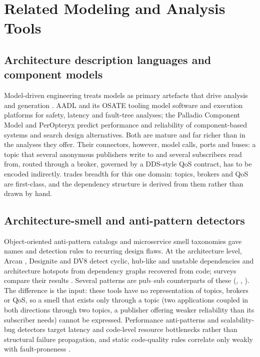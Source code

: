 \section{Related Modeling and Analysis Tools}
\label{sec:related_work}

\subsection{Architecture description languages and component models}
\label{sec:related:mde}

Model-driven engineering treats models as primary artefacts that drive analysis and generation \citep{schmidt2006mde, combemale2016global}. AADL and its OSATE tooling \citep{feiler2006aadl} model software and execution platforms for safety, latency and fault-tree analyses; the Palladio Component Model \citep{becker2009palladio} and PerOpteryx \citep{koziolek2011peropteryx} predict performance and reliability of component-based systems and search design alternatives. Both are mature and far richer than \sag{} in the analyses they offer. Their connectors, however, model calls, ports and buses: a topic that several anonymous publishers write to and several subscribers read from, routed through a broker, governed by a DDS-style QoS contract, has to be encoded indirectly. \sag{} trades breadth for this one domain: topics, brokers and QoS are first-class, and the dependency structure is derived from them rather than drawn by hand.

\subsection{Architecture-smell and anti-pattern detectors}
\label{sec:related:smells}

Object-oriented anti-pattern catalogs \citep{brown1998antipatterns, fowler1999refactoring, suryanarayana2014refactoring} and microservice smell taxonomies \citep{taibi2020microservices} gave names and detection rules to recurring design flaws. At the architecture level, Arcan \citep{arcan2017}, Designite \citep{sharma2016designite} and DV8 \citep{cai2019dv8} detect cyclic, hub-like and unstable dependencies and architecture hotspots \citep{mo2015hotspot} from dependency graphs recovered from code; surveys compare their results \citep{azadi2019architectural, mumtaz2021systematic}. Several \sag{} patterns are pub--sub counterparts of these (, , ). The difference is the input: these tools have no representation of topics, brokers or QoS, so a smell that exists only through a topic (two applications coupled in both directions through two topics, a publisher offering weaker reliability than its subscriber needs) cannot be expressed. Performance anti-patterns \citep{smith2000software, smith2002new, trubiani2023automated, pinciroli2023performance, avritzer2025architecture} and scalability-bug detectors \citep{stuardo2019scalecheck, li2018pcatch} target latency and code-level resource bottlenecks rather than structural failure propagation, and static code-quality rules correlate only weakly with fault-proneness \citep{lenarduzzi2020sonarqube}.

